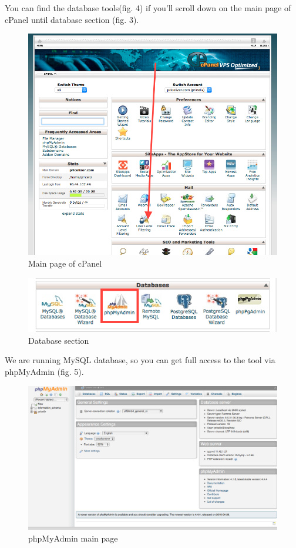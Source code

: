\documentclass[english]{article}
\begin{document}
You can find the database tools(fig. 4) if you'll scroll down on the main page of cPanel until database section 
(fig. 3).
\begin{figure}[H]
\centerline{\includegraphics[scale=0.35]{PDatabase/mcp}}
\caption{Main page of cPanel}
\end{figure}
\begin{figure}[H]
\centerline{\includegraphics[scale=0.5]{PDatabase/db}}
\caption{Database section}
\end{figure}

We are running MySQL database, so you can get full access to the tool via phpMyAdmin (fig. 5).
\begin{figure}[H]
\centerline{\includegraphics[scale=0.25]{PDatabase/dbm}}
\caption{phpMyAdmin main page}
\end{figure}
\end{document}
